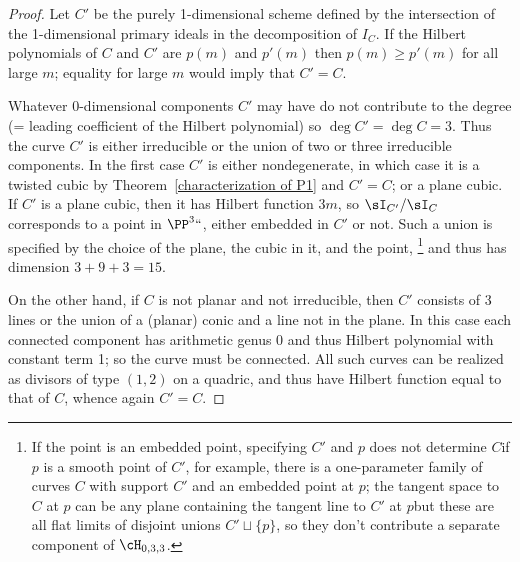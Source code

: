 \begin{proof}
Let $C'$ be the purely 1-dimensional scheme defined by the intersection
of the 1-dimensional primary ideals in the decomposition of $I_C$. If
the Hilbert polynomials of $C$ and $C'$ are $p(m)$ and  $p'(m)$ then
$p(m) \geq p'(m)$ for all large $m$; equality for large $m$ would imply
that $C'=C$.

Whatever 0-dimensional components $C'$ may have do not contribute
to the degree (= leading coefficient of the Hilbert polynomial) so
$\deg C' = \deg C = 3$. Thus the curve $C'$ is either irreducible or
the union of two or three irreducible components. In the first case
$C'$ is either nondegenerate, in which case it is a twisted cubic
by Theorem~\ref{characterization of P1} and $C' = C$; or a plane
cubic. If $C'$ is a plane cubic, then it has Hilbert function $3m$,
so $\sI_{C'}/\sI_C$
corresponds to a point in $\PP^3` `$, either embedded in $C'$ or not. Such
a union is specified by the choice of the
plane, the cubic in it, and the point,%
\footnote{If the point is an
embedded point, specifying $C'$ and $p$ does not determine $C$\emdash if $p$
is a smooth point of $C'$, for example, there is a one-parameter family
of curves $C$ with support $C'$ and an embedded point at $p$; the tangent
space to $C$ at $p$ can be any plane containing the tangent line to $C'$
at $p$\emdash but these are all flat limits of disjoint unions $C' \sqcup
\{p\}$, so they don't contribute a separate component of $\cH_{0,3,3}$.}
and thus has dimension $3+9+3 = 15$.

On the other hand, if $C$ is not planar and not irreducible, then $C'$
consists of 3 lines or the union of a (planar) conic
and a line not in the plane. In this case each connected component has
arithmetic genus 0 and thus Hilbert polynomial
with constant term 1; so the curve must be connected. All such curves
can be realized as divisors of type $(1,2)$
on a quadric, and thus have Hilbert function equal to that of $C$,
whence again $C' = C$.
\end{proof}


